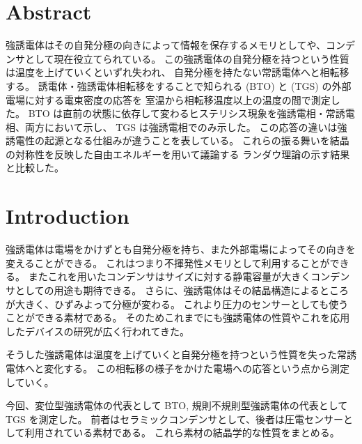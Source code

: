 \documentclass[11pt,dvipdfmx,a4paper]{jsarticle}
\begin{document}

\section{Abstract}
強誘電体はその自発分極の向きによって情報を保存するメモリとしてや、コンデンサとして現在役立てられている。
この強誘電体の自発分極を持つという性質は温度を上げていくといずれ失われ、
自発分極を持たない常誘電体へと相転移する。
誘電体・強誘電体相転移をすることで知られる
 (BTO) と  (TGS) の外部電場に対する電束密度の応答を
室温から相転移温度以上の温度の間で測定した。
BTO は直前の状態に依存して変わるヒステリシス現象を強誘電相・常誘電相、両方において示し、
TGS は強誘電相でのみ示した。
この応答の違いは強誘電性の起源となる仕組みが違うことを表している。
これらの振る舞いを結晶の対称性を反映した自由エネルギーを用いて議論する
ランダウ理論の示す結果と比較した。

\section{Introduction}
強誘電体は電場をかけずとも自発分極を持ち、また外部電場によってその向きを変えることができる。
これはつまり不揮発性メモリとして利用することができる。
またこれを用いたコンデンサはサイズに対する静電容量が大きくコンデンサとしての用途も期待できる。
さらに、強誘電体はその結晶構造によるところが大きく、ひずみよって分極が変わる。
これより圧力のセンサーとしても使うことができる素材である。
そのためこれまでにも強誘電体の性質やこれを応用したデバイスの研究が広く行われてきた。

そうした強誘電体は温度を上げていくと自発分極を持つという性質を失った常誘電体へと変化する。
この相転移の様子をかけた電場への応答という点から測定していく。

今回、変位型強誘電体の代表として BTO, 規則不規則型強誘電体の代表として TGS を測定した。
前者はセラミックコンデンサとして、後者は圧電センサーとして利用されている素材である。
これら素材の結晶学的な性質をまとめる。
\end{document}
